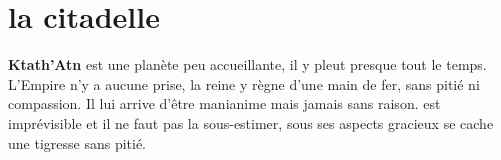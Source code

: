 \section{la citadelle}

\textbf{Ktath’Atn} est une planète peu accueillante, il y pleut presque tout le temps. L’Empire n’y a aucune prise, la reine y règne d’une main de fer, sans pitié ni compassion. Il lui arrive d’être manianime mais jamais sans raison.  est imprévisible et il ne faut pas la sous-estimer, sous ses aspects gracieux se cache une tigresse sans pitié.